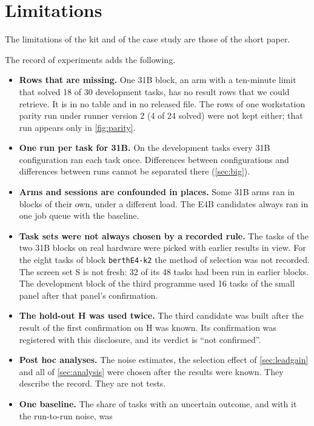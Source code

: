 \section{Limitations}\label{sec:limits}

The limitations of the kit and of the case study are those of the short paper.



The record of experiments adds the following.

\begin{itemize}[leftmargin=*,itemsep=2pt,topsep=3pt]
\item \textbf{Rows that are missing.} One 31B block, an arm with a ten-minute limit that solved 18 of 30 development
tasks, has no result rows that we could retrieve. It is in no table and in no released file. The rows of one
workstation parity run under runner version 2 (4 of 24 solved) were not kept either; that run appears only in
\cref{fig:parity}.
\item \textbf{One run per task for 31B.} On the development tasks every 31B configuration ran each task once.
Differences between configurations and differences between runs cannot be separated there (\cref{sec:big}).
\item \textbf{Arms and sessions are confounded in places.} Some 31B arms ran in blocks of their own, under a
different load. The E4B candidates always ran in one job queue with the baseline.
\item \textbf{Task sets were not always chosen by a recorded rule.} The tasks of the two 31B blocks on real hardware
were picked with earlier results in view. For the eight tasks of block \texttt{berthE4-k2} the method of selection
was not recorded. The screen set S is not fresh: 32 of its 48 tasks had been run in earlier blocks. The development
block of the third programme used 16 tasks of the small panel after that panel's confirmation.
\item \textbf{The hold-out H was used twice.} The third candidate was built after the result of the first
confirmation on H was known. Its confirmation was registered with this disclosure, and its verdict is ``not
confirmed''.
\item \textbf{Post hoc analyses.} The noise estimates, the selection effect of \cref{sec:leadgain} and all of
\cref{sec:analysis} were chosen after the results were known. They describe the record. They are not tests.
\item \textbf{One baseline.} The share of tasks with an uncertain outcome, and with it the run-to-run noise, was

\end{itemize}
